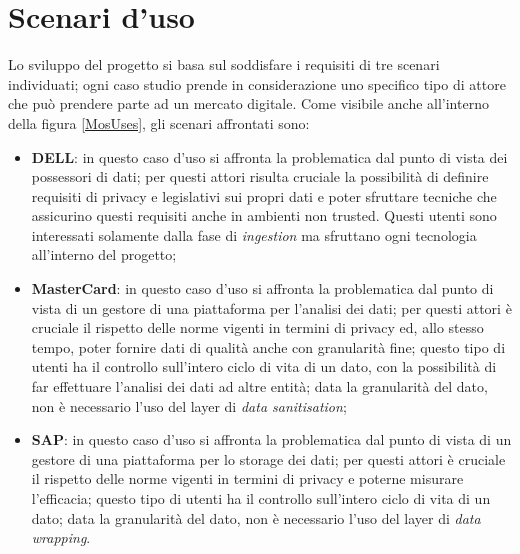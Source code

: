 \documentclass[12pt,a4paper,twoside]{book}
\begin{document}
\section{Scenari d'uso}
Lo sviluppo del progetto si basa sul soddisfare i requisiti di tre scenari individuati; ogni caso studio prende in considerazione uno specifico tipo di attore che può prendere parte ad un mercato digitale. Come visibile anche all'interno della figura \ref{MosUses}, gli scenari affrontati sono:
\begin{itemize}
\item \textbf{DELL}: in questo caso d'uso si affronta la problematica dal punto di vista dei possessori di dati; per questi attori risulta cruciale la possibilità di definire requisiti di privacy e legislativi sui propri dati e poter sfruttare tecniche che assicurino questi requisiti anche in ambienti non trusted. Questi utenti sono interessati solamente dalla fase di \textit{ingestion} ma sfruttano ogni tecnologia all'interno del progetto;
\item \textbf{MasterCard}: in questo caso d'uso si affronta la problematica dal punto di vista di un gestore di una piattaforma per l'analisi dei dati; per questi attori è cruciale il rispetto delle norme vigenti in termini di privacy ed, allo stesso tempo, poter fornire dati di qualità anche con granularità fine; questo tipo di utenti ha il controllo sull'intero ciclo di vita di un dato, con la possibilità di far effettuare l'analisi dei dati ad altre entità; data la granularità del dato, non è necessario l'uso del layer di \textit{data sanitisation};
\item \textbf{SAP}: in questo caso d'uso si affronta la problematica dal punto di vista di un gestore di una piattaforma per lo storage dei dati; per questi attori è cruciale il rispetto delle norme vigenti in termini di privacy e poterne misurare l'efficacia; questo tipo di utenti ha il controllo sull'intero ciclo di vita di un dato; data la granularità del dato, non è necessario l'uso del layer di \textit{data wrapping}.
\end{itemize}
\end{document}
